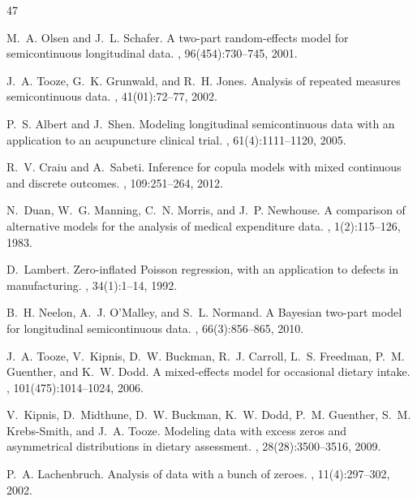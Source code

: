 \documentclass[11pt, a4paper]{article}
\begin{document}
\begin{thebibliography}{47}

M.~A. Olsen and J.~L. Schafer.
\newblock A two-part random-effects model for semicontinuous longitudinal data.
, 96(454):730--745, 2001.

J.~A. Tooze, G.~K. Grunwald, and R.~H. Jones.
\newblock Analysis of repeated measures semicontinuous data.
, 41(01):72--77, 2002.

P.~S. Albert and J.~Shen.
\newblock Modeling longitudinal semicontinuous data with an application to an acupuncture clinical trial.
, 61(4):1111--1120, 2005.

R.~V. Craiu and A.~Sabeti.
\newblock Inference for copula models with mixed continuous and discrete outcomes.
, 109:251--264, 2012.

N.~Duan, W.~G. Manning, C.~N. Morris, and J.~P. Newhouse.
\newblock A comparison of alternative models for the analysis of medical expenditure data.
, 1(2):115--126, 1983.

D.~Lambert.
\newblock Zero-inflated Poisson regression, with an application to defects in manufacturing.
, 34(1):1--14, 1992.

B.~H. Neelon, A.~J. O'Malley, and S.~L. Normand.
\newblock A Bayesian two-part model for longitudinal semicontinuous data.
, 66(3):856--865, 2010.

J.~A. Tooze, V.~Kipnis, D.~W. Buckman, R.~J. Carroll, L.~S. Freedman, P.~M. Guenther, and K.~W. Dodd.
\newblock A mixed-effects model for occasional dietary intake.
, 101(475):1014--1024, 2006.

V.~Kipnis, D.~Midthune, D.~W. Buckman, K.~W. Dodd, P.~M. Guenther, S.~M. Krebs-Smith, and J.~A. Tooze.
\newblock Modeling data with excess zeros and asymmetrical distributions in dietary assessment.
, 28(28):3500--3516, 2009.

P.~A. Lachenbruch.
\newblock Analysis of data with a bunch of zeroes.
, 11(4):297--302, 2002.


\end{thebibliography}
\end{document}
